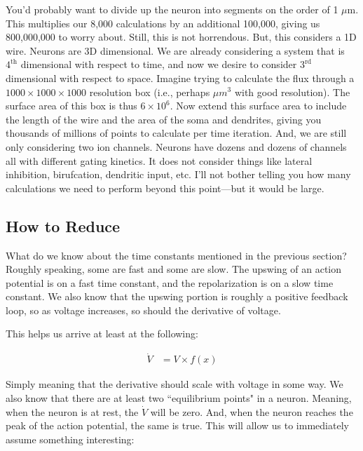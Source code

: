 You'd probably want to divide up the neuron into segments on the order of 1 $\mu$m. This multiplies our 8,000 calculations by an additional 100,000, giving us 800,000,000 to worry about. Still, this is not horrendous. But, this considers a 1D wire. Neurons are 3D dimensional. We are already considering a system that is $4^{\mathrm{th}}$ dimensional with respect to time, and now we desire to consider $3^{\mathrm{rd}}$ dimensional with respect to space. Imagine trying to calculate the flux through a $1000 \times 1000 \times 1000$ resolution box (i.e., perhaps $\mu m^3$ with good resolution). The surface area of this box is thus $6\times 10^6$. Now extend this surface area to include the length of the wire and the area of the soma and dendrites, giving you thousands of millions of points to calculate per time iteration. And, we are still only considering two ion channels. Neurons have dozens and dozens of channels all with different gating kinetics. It does not consider things like lateral inhibition, birufcation, dendritic input, etc. I'll not bother telling you how many calculations we need to perform beyond this point---but it would be large. 

\subsection{How to Reduce} What do we know about the time constants mentioned in the previous section? Roughly speaking, some are fast and some are slow. The upswing of an action potential is on a fast time constant, and the repolarization is on a slow time constant. We also know that the upswing portion is roughly a positive feedback loop, so as voltage increases, so should the derivative of voltage.\newline

This helps us arrive at least at the following: 

\begin{equation} \label{fn1}
\begin{split}
\dot{V} &= V \times f(x)
\end{split}
\end{equation}


Simply meaning that the derivative should scale with voltage in some way. We also know that there are at least two ``equilibrium points" in a neuron. Meaning, when the neuron is at rest, the $\dot{V}$ will be zero. And, when the neuron reaches the peak of the action potential, the same is true. This will allow us to immediately assume something interesting:

